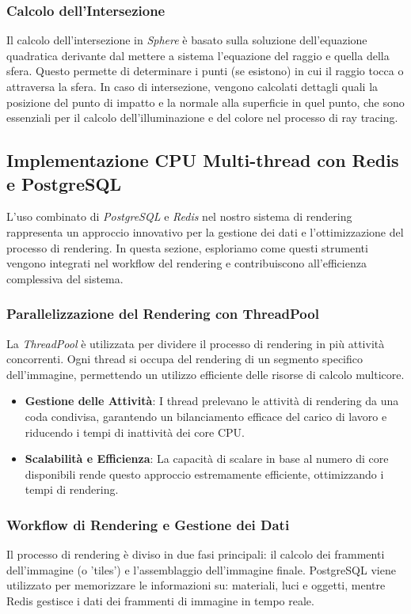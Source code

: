 \documentclass[12pt]{article}
\begin{document}
\subsubsection{Calcolo dell'Intersezione}
Il calcolo dell'intersezione in \textit{Sphere} è basato sulla soluzione dell'equazione quadratica derivante dal mettere a sistema l'equazione del raggio e quella della sfera. Questo permette di determinare i punti (se esistono) in cui il raggio tocca o attraversa la sfera. In caso di intersezione, vengono calcolati dettagli quali la posizione del punto di impatto e la normale alla superficie in quel punto, che sono essenziali per il calcolo dell'illuminazione e del colore nel processo di ray tracing.

\subsection{Implementazione CPU Multi-thread con Redis e PostgreSQL}
L'uso combinato di \textit{PostgreSQL} e \textit{Redis} nel nostro sistema di rendering rappresenta un approccio innovativo per la gestione dei dati e l'ottimizzazione del processo di rendering. In questa sezione, esploriamo come questi strumenti vengono integrati nel workflow del rendering e contribuiscono all'efficienza complessiva del sistema.

\subsubsection{Parallelizzazione del Rendering con ThreadPool}
La \textit{ThreadPool} è utilizzata per dividere il processo di rendering in più attività concorrenti. Ogni thread si occupa del rendering di un segmento specifico dell'immagine, permettendo un utilizzo efficiente delle risorse di calcolo multicore.

\begin{itemize}
\item \textbf{Gestione delle Attività}: I thread prelevano le attività di rendering da una coda condivisa, garantendo un bilanciamento efficace del carico di lavoro e riducendo i tempi di inattività dei core CPU.

\item \textbf{Scalabilità e Efficienza}: La capacità di scalare in base al numero di core disponibili rende questo approccio estremamente efficiente, ottimizzando i tempi di rendering.
\end{itemize}

\subsubsection{Workflow di Rendering e Gestione dei Dati}
Il processo di rendering è diviso in due fasi principali: il calcolo dei frammenti dell'immagine (o 'tiles') e l'assemblaggio dell'immagine finale. PostgreSQL viene utilizzato per memorizzare le informazioni su: materiali, luci e oggetti, mentre Redis gestisce i dati dei frammenti di immagine in tempo reale.
\end{document}
